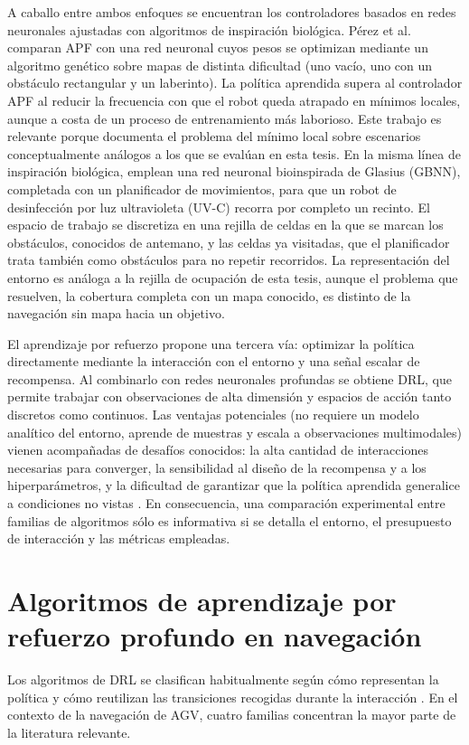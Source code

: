 A caballo entre ambos enfoques se encuentran los controladores basados en
redes neuronales ajustadas con algoritmos de inspiración biológica. Pérez
et al. \citep{perez2022navigation} comparan APF con una red neuronal cuyos
pesos se optimizan mediante un algoritmo genético sobre mapas de distinta
dificultad (uno vacío, uno con un obstáculo rectangular y un laberinto). La
política aprendida supera al controlador APF al reducir la frecuencia con
que el robot queda atrapado en mínimos locales, aunque a costa de un
proceso de entrenamiento más laborioso. Este trabajo es relevante porque
documenta el problema del mínimo local sobre escenarios conceptualmente
análogos a los que se evalúan en esta tesis. En la misma línea de
inspiración biológica, \citet{rodrigo2023gbnn} emplean una red neuronal
bioinspirada de Glasius (GBNN), completada con un planificador de
movimientos, para que un robot de desinfección por luz ultravioleta
(UV-C) recorra por completo un recinto. El espacio de trabajo se
discretiza en una rejilla de celdas en la que se marcan los obstáculos,
conocidos de antemano, y las celdas ya visitadas, que el planificador
trata también como obstáculos para no repetir recorridos. La
representación del entorno es análoga a la rejilla de ocupación de esta
tesis, aunque el problema que resuelven, la cobertura completa con un
mapa conocido, es distinto de la navegación sin mapa hacia un objetivo.

El aprendizaje por refuerzo propone una tercera vía: optimizar la política
directamente mediante la interacción con el entorno y una señal escalar de
recompensa. Al combinarlo con redes neuronales profundas se obtiene DRL,
que permite trabajar con observaciones de alta dimensión y espacios de
acción tanto discretos como continuos. Las ventajas potenciales (no
requiere un modelo analítico del entorno, aprende de muestras y escala a
observaciones multimodales) vienen acompañadas de desafíos conocidos: la
alta cantidad de interacciones necesarias para converger, la sensibilidad
al diseño de la recompensa y a los hiperparámetros, y la dificultad de
garantizar que la política aprendida generalice a condiciones no vistas
\citep{shakya2023reinforcement,sivashangaran2023deep}. En consecuencia, una
comparación experimental entre familias de algoritmos sólo es informativa
si se detalla el entorno, el presupuesto de interacción y las métricas
empleadas.

\section{Algoritmos de aprendizaje por refuerzo profundo en navegación}
Los algoritmos de DRL se clasifican habitualmente según cómo representan la
política y cómo reutilizan las transiciones recogidas durante la
interacción \citep{shakya2023reinforcement,murphy2025reinforcement}. En el
contexto de la navegación de AGV, cuatro familias concentran la mayor
parte de la literatura relevante.

